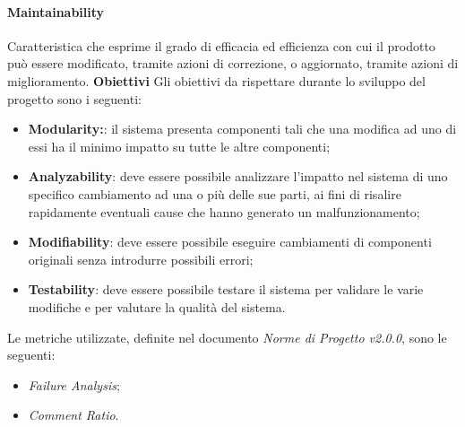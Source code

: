 \paragraph{Maintainability} \Spazio
	Caratteristica che esprime il grado di efficacia ed efficienza con cui il prodotto può essere modificato, tramite azioni di correzione, o aggiornato, tramite azioni di miglioramento. \Spazio
	\textbf{Obiettivi} \Spazio
	Gli obiettivi da rispettare durante lo sviluppo del progetto sono i seguenti:
	\begin{itemize}
		\item{\textbf{Modularity:}: il sistema presenta componenti tali che una modifica ad uno di essi ha il minimo impatto su tutte le altre componenti;
		}
		\item{\textbf{Analyzability}: deve essere possibile analizzare l'impatto nel sistema di uno specifico cambiamento ad una o più delle sue parti, ai fini
		di risalire rapidamente eventuali cause che hanno generato un malfunzionamento;
 		}
		\item{\textbf{Modifiability}: deve essere possibile eseguire cambiamenti di componenti originali senza introdurre possibili errori;
		}
		\item{\textbf{Testability}: deve essere possibile testare il sistema per validare le varie modifiche e per valutare la qualità del sistema.
		}
	\end{itemize}
	Le metriche utilizzate, definite nel documento \emph{Norme di Progetto v2.0.0}, sono le seguenti:
	\begin{itemize}
		\item{\emph{Failure Analysis};}
		\item{\emph{Comment Ratio}.}
	\end{itemize}	


